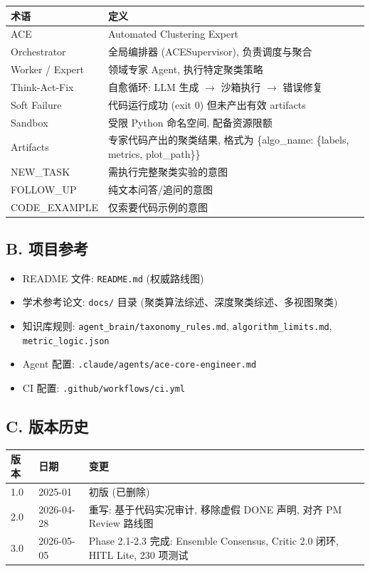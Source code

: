 \documentclass[12pt,a4paper]{article}
\begin{document}
\begin{table}[H]
\centering
\begin{tabular}{@{}lp{7cm}@{}}
\toprule
\textbf{术语} & \textbf{定义} \\
\midrule
ACE & Automated Clustering Expert \\
Orchestrator & 全局编排器 (ACESupervisor), 负责调度与聚合 \\
Worker / Expert & 领域专家 Agent, 执行特定聚类策略 \\
Think-Act-Fix & 自愈循环: LLM 生成 $\rightarrow$ 沙箱执行 $\rightarrow$ 错误修复 \\
Soft Failure & 代码运行成功 (exit 0) 但未产出有效 artifacts \\
Sandbox & 受限 Python 命名空间, 配备资源限额 \\
Artifacts & 专家代码产出的聚类结果, 格式为 \{algo\_name: \{labels, metrics, plot\_path\}\} \\
NEW\_TASK & 需执行完整聚类实验的意图 \\
FOLLOW\_UP & 纯文本问答/追问的意图 \\
CODE\_EXAMPLE & 仅索要代码示例的意图 \\
\bottomrule
\end{tabular}
\end{table}

\subsection{B. 项目参考}

\begin{itemize}[nosep]
    \item README 文件: \texttt{README.md} (权威路线图)
    \item 学术参考论文: \texttt{docs/} 目录 (聚类算法综述、深度聚类综述、多视图聚类)
    \item 知识库规则: \texttt{agent\_brain/taxonomy\_rules.md}, \texttt{algorithm\_limits.md}, \texttt{metric\_logic.json}
    \item Agent 配置: \texttt{.claude/agents/ace-core-engineer.md}
    \item CI 配置: \texttt{.github/workflows/ci.yml}
\end{itemize}

\subsection{C. 版本历史}

\begin{table}[H]
\centering
\begin{tabular}{@{}llp{8cm}@{}}
\toprule
\textbf{版本} & \textbf{日期} & \textbf{变更} \\
\midrule
1.0 & 2025-01 & 初版 (已删除) \\
2.0 & 2026-04-28 & 重写: 基于代码实况审计, 移除虚假 DONE 声明, 对齐 PM Review 路线图 \\
3.0 & 2026-05-05 & Phase 2.1-2.3 完成: Ensemble Consensus, Critic 2.0 闭环, HITL Lite, 230 项测试 \\
\bottomrule
\end{tabular}
\end{table}
\end{document}
